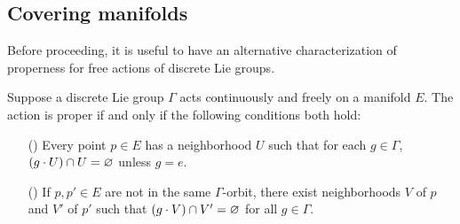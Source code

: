 \subsection{Covering manifolds}
Before proceeding, it is useful to have an alternative characterization of properness for free actions of discrete Lie groups.
\begin{lemma}\label{Lie discrete free proper iff}
Suppose a discrete Lie group $\Gamma$ acts continuously and freely on a manifold $E$. The action is proper if and only if the following conditions both hold:
\begin{itemize}
\item[(\rmnum{1})] Every point $p\in E$ has a neighborhood $U$ such that for each $g\in\Gamma$, $(g\cdot U)\cap U=\varnothing$ unless $g=e$.
\item[(\rmnum{2})] If $p,p'\in E$ are not in the same $\Gamma$-orbit, there 
exist neighborhoods $V$ of $p$ and $V'$ of $p'$ such that $(g\cdot V)\cap V'=\varnothing$ for all $g\in\Gamma$.
\end{itemize}
\end{lemma}
